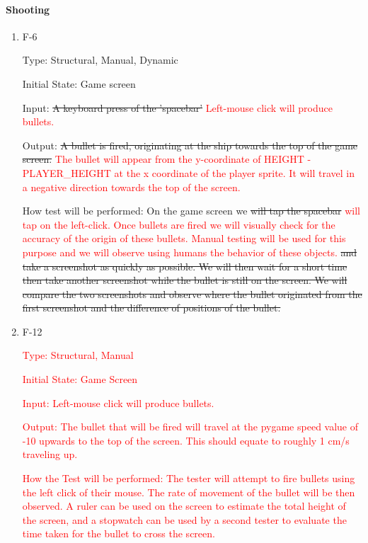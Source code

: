 \documentclass[12pt, titlepage]{article}
\begin{document}
\paragraph{Shooting}

\begin{enumerate}

\item{F-6\\}

Type: Structural, Manual, Dynamic

Initial State: Game screen

Input: \sout{A keyboard press of the 'spacebar'} \textcolor{red}{Left-mouse click will produce bullets.} 

Output: \sout{A bullet is fired, originating at the ship towards the top of the game screen.} \textcolor{red}{The bullet will appear from the y-coordinate of HEIGHT - PLAYER\_HEIGHT at the x coordinate of the player sprite. It will travel in a negative direction towards the top of the screen. } 

How test will be performed: On the game screen we \sout{will tap the spacebar} \textcolor{red}{will tap on the left-click. Once bullets are fired we will visually check for the accuracy of the origin of these bullets. Manual testing will be used for this purpose and we will observe using humans the behavior of these objects.}  \sout{and take a screenshot as quickly as possible. We will then wait for a short time then take another screenshot while the bullet is still on the screen. We will compare the two screenshots and observe where the bullet originated from the first screenshot and the difference of positions of the bullet.}

\item {F-12\\}

\textcolor{red}{Type: Structural, Manual}

\textcolor{red}{Initial State: Game Screen}

\textcolor{red}{Input: Left-mouse click will produce bullets. }

\textcolor{red}{Output: The bullet that will be fired will travel at the pygame speed value of -10 upwards to the top of the screen. This should equate to roughly 1 cm/s traveling up.}

\textcolor{red}{How the Test will be performed: The tester will attempt to fire bullets using the left click of their mouse. The rate of movement of the bullet will be then observed. A ruler can be used on the screen to estimate the total height of the screen, and a stopwatch can be used by a second tester to evaluate the time taken for the bullet to cross the screen.}


\end{enumerate}
\end{document}
